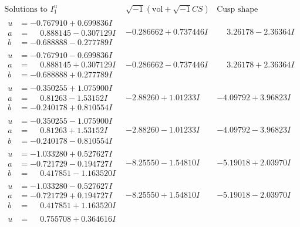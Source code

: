 \documentclass[1p]{elsarticle_modified}
\theoremstyle{definition}
\newcommand{\I}{\sqrt{-1}}
\begin{document}
$$\begin{array}{c|c|c}  
\text{Solutions to }I^u_{1}& \I (\text{vol} + \sqrt{-1}CS) & \text{Cusp shape}\\
 \hline 
\begin{aligned}
u &= -0.767910 + 0.699836 I \\
a &= \phantom{-}0.888145 - 0.307129 I \\
b &= -0.688888 - 0.277789 I\end{aligned}
 & -0.286662 + 0.737446 I & \phantom{-}3.26178 - 2.36364 I \\ \hline\begin{aligned}
u &= -0.767910 - 0.699836 I \\
a &= \phantom{-}0.888145 + 0.307129 I \\
b &= -0.688888 + 0.277789 I\end{aligned}
 & -0.286662 - 0.737446 I & \phantom{-}3.26178 + 2.36364 I \\ \hline\begin{aligned}
u &= -0.350255 + 1.075900 I \\
a &= \phantom{-}0.81263 - 1.53152 I \\
b &= -0.240178 + 0.810554 I\end{aligned}
 & -2.88260 + 1.01233 I & -4.09792 + 3.96823 I \\ \hline\begin{aligned}
u &= -0.350255 - 1.075900 I \\
a &= \phantom{-}0.81263 + 1.53152 I \\
b &= -0.240178 - 0.810554 I\end{aligned}
 & -2.88260 - 1.01233 I & -4.09792 - 3.96823 I \\ \hline\begin{aligned}
u &= -1.033280 + 0.527627 I \\
a &= -0.721729 - 0.194727 I \\
b &= \phantom{-}0.417851 - 1.163520 I\end{aligned}
 & -8.25550 - 1.54810 I & -5.19018 + 2.03970 I \\ \hline\begin{aligned}
u &= -1.033280 - 0.527627 I \\
a &= -0.721729 + 0.194727 I \\
b &= \phantom{-}0.417851 + 1.163520 I\end{aligned}
 & -8.25550 + 1.54810 I & -5.19018 - 2.03970 I \\ \hline\begin{aligned}
u &= \phantom{-}0.755708 + 0.364616 I \\

\end{aligned}
\end{array}$$
\end{document}

